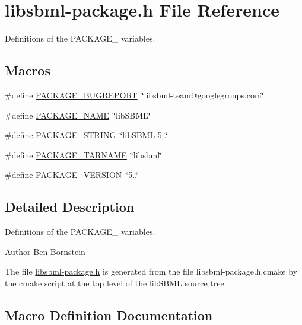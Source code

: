 \hypertarget{libsbml-package_8h}{}\section{libsbml-\/package.h File Reference}
\label{libsbml-package_8h}


Definitions of the P\+A\+C\+K\+A\+G\+E\+\_\+ variables.  


\subsection*{Macros}
\begin{DoxyCompactItemize}
\item 
\#define \hyperlink{libsbml-package_8h_a1d1d2d7f8d2f95b376954d649ab03233}{P\+A\+C\+K\+A\+G\+E\+\_\+\+B\+U\+G\+R\+E\+P\+O\+RT}~\char`\"{}libsbml-\/team@googlegroups.\+com\char`\"{}
\item 
\#define \hyperlink{libsbml-package_8h_a1c0439e4355794c09b64274849eb0279}{P\+A\+C\+K\+A\+G\+E\+\_\+\+N\+A\+ME}~\char`\"{}lib\+S\+B\+ML\char`\"{}
\item 
\#define \hyperlink{libsbml-package_8h_ac73e6f903c16eca7710f92e36e1c6fbf}{P\+A\+C\+K\+A\+G\+E\+\_\+\+S\+T\+R\+I\+NG}~\char`\"{}lib\+S\+B\+ML 5..\char`\"{}
\item 
\#define \hyperlink{libsbml-package_8h_af415af6bfede0e8d5453708afe68651c}{P\+A\+C\+K\+A\+G\+E\+\_\+\+T\+A\+R\+N\+A\+ME}~\char`\"{}libsbml\char`\"{}
\item 
\#define \hyperlink{libsbml-package_8h_aa326a05d5e30f9e9a4bb0b4469d5d0c0}{P\+A\+C\+K\+A\+G\+E\+\_\+\+V\+E\+R\+S\+I\+ON}~\char`\"{}5..\char`\"{}
\end{DoxyCompactItemize}


\subsection{Detailed Description}
Definitions of the P\+A\+C\+K\+A\+G\+E\+\_\+ variables. 

\begin{DoxyAuthor}{Author}
Ben Bornstein
\end{DoxyAuthor}
The file {\ttfamily \hyperlink{libsbml-package_8h}{libsbml-\/package.\+h}} is generated from the file {\ttfamily libsbml-\/package.\+h.\+cmake} by the {\ttfamily cmake} script at the top level of the lib\+S\+B\+ML source tree. 

\subsection{Macro Definition Documentation}
\mbox{\label{libsbml-package_8h_a1d1d2d7f8d2f95b376954d649ab03233}} 
